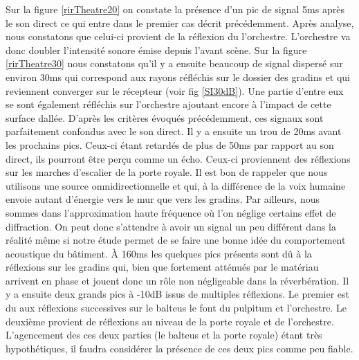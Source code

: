 Sur la figure \ref{rirTheatre20} on constate la présence d'un pic de signal 5ms après le son direct ce qui entre dans le premier cas décrit précédemment. Après analyse, nous constatons que celui-ci provient de la réflexion du l'orchestre. L'orchestre va donc doubler l'intensité sonore émise depuis l'avant scène. Sur la figure \ref{rirTheatre30} nous constatons qu'il y a ensuite beaucoup de signal dispersé sur environ 30ms qui correspond aux rayons réfléchis sur le dossier des gradins et qui reviennent converger sur le récepteur (voir fig \ref{SI30dB}). Une partie d'entre eux se sont également réfléchis sur l'orchestre ajoutant encore à l'impact de cette surface dallée. D'après les critères évoqués précédemment, ces signaux sont parfaitement confondus avec le son direct. Il y a ensuite un trou de 20ms avant les prochains pics. Ceux-ci étant retardés de plus de 50ms par rapport au son direct, ils pourront être perçu comme un écho. Ceux-ci proviennent des réflexions sur les marches d'escalier de la porte royale. Il est bon de rappeler que nous utilisons une source omnidirectionnelle et qui, à la différence de la voix humaine envoie autant d'énergie vers le mur que vers les gradins. Par ailleurs, nous sommes dans l'approximation haute fréquence où l'on néglige certains effet de diffraction. On peut donc s'attendre à avoir un signal un peu différent dans la réalité même si notre étude permet de se faire une bonne idée du comportement acoustique du bâtiment. À 160ms les quelques pics présents sont dû à la réflexions sur les gradins qui, bien que fortement atténués par le matériau arrivent en phase et jouent donc un rôle non négligeable dans la réverbération. Il y a ensuite deux grands pics à -10dB issus de multiples réflexions. Le premier est du aux réflexions successives sur le \gls{balteus} le font du \gls{pulpitum} et l'orchestre. Le deuxième provient de réflexions au niveau de la porte royale et de l'orchestre. L'agencement des ces deux parties (le \gls{balteus} et la porte royale) étant très hypothétiques, il faudra considérer la présence de ces deux pics comme peu fiable.
%
